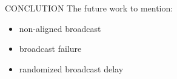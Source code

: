 \documentclass[10pt, conference, letterpaper]{IEEEtran}
\begin{document}
    \begin{section}{CONCLUTION}
        \label{sec:conclusion}
        The future work to mention:
        \begin{itemize}
            \item non-aligned broadcast
            \item broadcast failure
            \item randomized broadcast delay
        \end{itemize}
    \end{section}

    
    
\end{document}
